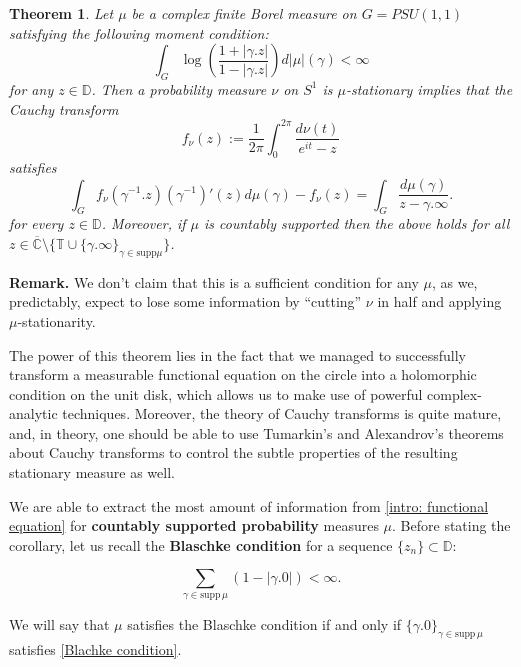 \documentclass[11pt]{article}
\newtheorem{theorem}{Theorem}[section]
\begin{document}
\begin{theorem}
	\label{T:main result}
	Let $\mu$ be a complex finite Borel measure on $G=PSU(1,1)$ satisfying the following moment condition:
	\begin{equation}
		\int_{G} \log\left( \frac{1 + |\gamma.z| }{1 - |\gamma.z|} \right)  d |\mu| (\gamma) < \infty
	\end{equation}
	for any $z \in \mathbb{D}$.	Then a probability measure $\nu$ on $S^1$ is $\mu$-stationary implies that the Cauchy transform 
	\[
	f_\nu(z) := \frac{1}{2\pi} \int_{0}^{2\pi} \dfrac{d\nu(t)}{e^{it} - z}
	\] 
	satisfies
	\begin{equation}
		\label{intro: functional equation}
		\int_G f_\nu(\gamma^{-1}.z)(\gamma^{-1})'(z)  d\mu(\gamma) - f_\nu(z) = \int_G \frac{d \mu(\gamma)}{z - \gamma.\infty}.
	\end{equation}
	for every $z \in \mathbb{D}$. Moreover, if $\mu$ is countably supported then the above holds for all \\ $z \in \overline{\mathbb{C}} \setminus \{ \mathbb{T} \cup \{ \gamma.\infty \}_{\gamma \in \text{supp} \mu } \}$.
\end{theorem}

\textbf{Remark.} We don't claim that this is a sufficient condition for any $\mu$, as we, predictably, expect to lose some information by ``cutting'' $\nu$ in half and applying $\mu$-stationarity.

The power of this theorem lies in the fact that we managed to successfully transform a measurable functional equation on the circle into a holomorphic condition on the unit disk, which allows us to make use of powerful complex-analytic techniques. Moreover, the theory of Cauchy transforms is quite mature, and, in theory, one should be able to use Tumarkin's and Alexandrov's theorems about Cauchy transforms to control the subtle properties of the resulting stationary measure as well.

We are able to extract the most amount of information from \eqref{intro: functional equation} for \textbf{countably supported probability} measures $\mu$. Before stating the corollary, let us recall the \textbf{Blaschke condition} for a sequence $\{ z_n \} \subset \mathbb{D}$:

\begin{equation}
	\label{Blachke condition}
	\sum_{\gamma \in \text{supp} \, \mu} (1 - |\gamma.0|) < \infty.
\end{equation}

We will say that $\mu$ satisfies the Blaschke condition if and only if $\{ \gamma.0 \}_{\gamma \in \text{supp} \, \mu}$ satisfies \eqref{Blachke condition}.
\end{document}
